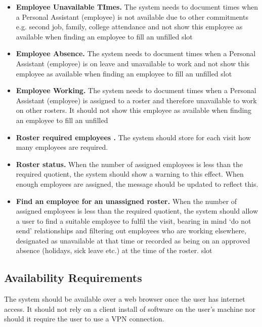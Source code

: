 \documentclass[a4paper,12pt]{article}
\begin{document}
\begin{samepage}
\begin{itemize}
\item \textbf{Employee Unavailable TImes.} The system needs to document times when a  Personal Assistant (employee) is not available due to other commitments e.g. second job, family, college attendance and not show this employee as available when finding an employee to fill an unfilled slot 
\newpage
\item \textbf{Employee Absence.} The system needs to document times when a  Personal Assistant (employee) is on leave and unavailable to work and not show this employee as available when finding an employee to fill an unfilled slot 
\item \textbf{Employee Working.} The system needs to document times when a  Personal Assistant (employee) is assigned to a roster and therefore unavailable to work on other rosters. It should not show this employee as available when finding an employee to fill an unfilled 
\item \textbf{Roster required employees .} The system should store for each visit how many employees are required.
\item \textbf{Roster status.} When the number of assigned employees is less than the required quotient, the system should show a warning to this effect. When enough employees are assigned, the message should be updated to reflect this.
\item \textbf{Find an employee for an unassigned roster.} When the number of assigned employees is less than the required quotient, the system should allow a user to find a suitable employee to fulfil the visit, bearing in mind `do not send' relationships and filtering out employees who are working elsewhere, designated as unavailable at that time or recorded as being on an approved absence (holidays, sick leave etc.) at the time of the roster.
slot 
\end{itemize}
\subsection {Availability Requirements }

The system should be available over a web browser once the user has internet access. It should not rely on a client install of software on the user's machine nor should it require the user to use a VPN connection. 


\end{samepage}
\end{document}

